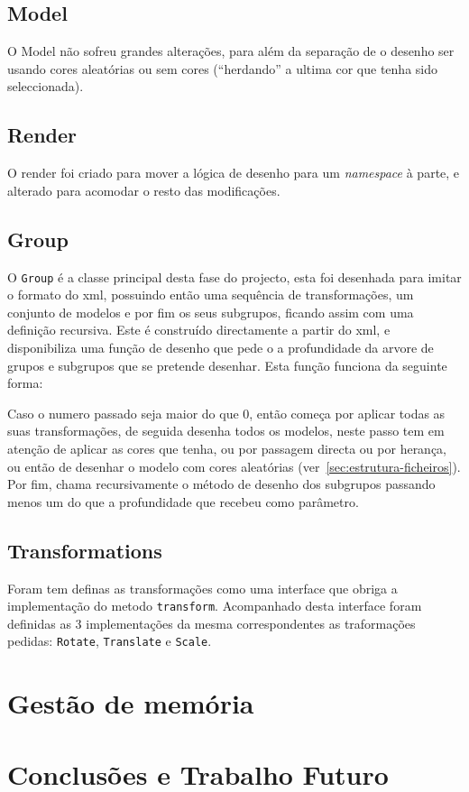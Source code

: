 \documentclass[a4paper]{article}
\begin{document}
\subsection{Model}

O Model não sofreu grandes alterações, para além da separação de o desenho ser usando cores aleatórias ou sem cores (``herdando'' a ultima cor que tenha sido seleccionada).

\subsection{Render}

O render foi criado para mover a lógica de desenho para um \textit{namespace} à parte, e alterado para acomodar o resto das modificações.

\subsection{Group}

O \texttt{Group} é a classe principal desta fase do projecto, esta foi desenhada para imitar o formato do xml, possuindo então uma sequência de transformações, um conjunto de modelos e por fim os seus subgrupos, ficando assim com uma definição recursiva. Este é construído directamente a partir do xml, e disponibiliza uma função de desenho que pede o a profundidade da arvore de grupos e subgrupos que se pretende desenhar. Esta função funciona da seguinte forma:

Caso o numero passado seja maior do que 0, então começa por aplicar todas as suas transformações, de seguida desenha todos os modelos, neste passo tem em atenção de aplicar as cores que tenha, ou por passagem directa ou por herança, ou então de desenhar o modelo com cores aleatórias (ver~\ref{sec:estrutura-ficheiros}). Por fim, chama recursivamente o método de desenho dos subgrupos passando menos um do que a profundidade que recebeu como parâmetro.

\subsection{Transformations}

Foram tem definas as transformações como uma interface que obriga a implementação do metodo \texttt{transform}. Acompanhado desta interface foram definidas as 3 implementações da mesma correspondentes as traformações pedidas: \texttt{Rotate}, \texttt{Translate} e \texttt{Scale}.

\section{Gestão de memória}

\section{Conclusões e Trabalho Futuro}
\end{document}
